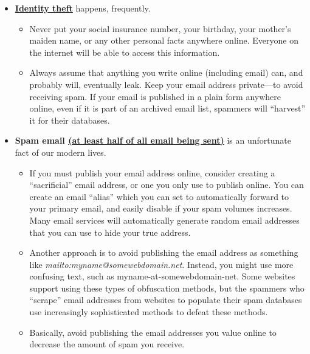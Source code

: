 \documentclass[
  letterpaper,
  DIV=11,
  numbers=noendperiod]{scrreprt}
\providecommand{\tightlist}{%
  \setlength{\itemsep}{0pt}\setlength{\parskip}{0pt}}\usepackage{longtable,booktabs,array}
\begin{document}
\begin{itemize}
\tightlist
\item
  \href{https://en.wikipedia.org/wiki/Identity_theft}{\textbf{Identity
  theft}} happens, frequently.

  \begin{itemize}
  \tightlist
  \item
    Never put your social insurance number, your birthday, your mother's
    maiden name, or any other personal facts anywhere online. Everyone
    on the internet will be able to access this information.
  \item
    Always assume that anything you write online (including email) can,
    and probably will, eventually leak. Keep your email address
    private---to avoid receiving spam. If your email is published in a
    plain form anywhere online, even if it is part of an archived email
    list, spammers will ``harvest'' it for their databases.
  \end{itemize}
\item
  \textbf{Spam email
  \href{https://securelist.com/spam-report-2019/96527/}{(at least half
  of all email being sent)}} is an unfortunate fact of our modern lives.

  \begin{itemize}
  \tightlist
  \item
    If you must publish your email address online, consider creating a
    ``sacrificial'' email address, or one you only use to publish
    online. You can create an email ``alias'' which you can set to
    automatically forward to your primary email, and easily disable if
    your spam volumes increases. Many email services will automatically
    generate random email addresses that you can use to hide your true
    address.
  \item
    Another approach is to avoid publishing the email address as
    something like \emph{mailto:myname@somewebdomain.net}. Instead, you
    might use more confusing text, such as myname-at-somewebdomain-net.
    Some websites support using these types of obfuscation methods, but
    the spammers who ``scrape'' email addresses from websites to
    populate their spam databases use increasingly sophisticated methods
    to defeat these methods.
  \item
    Basically, avoid publishing the email addresses you value online to
    decrease the amount of spam you receive.
  \end{itemize}
\end{itemize}
\end{document}
